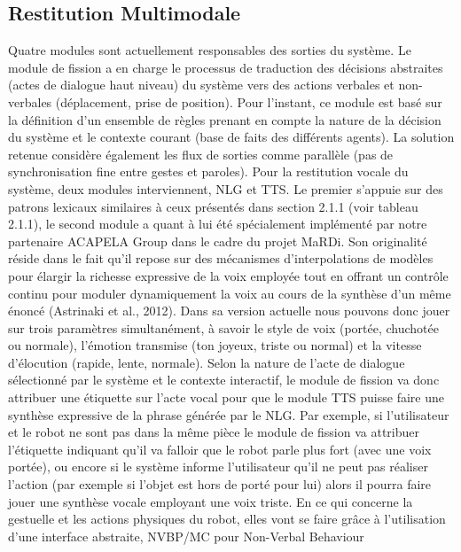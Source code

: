 \documentclass[a4paper,11pt,twoside]{StyleThese}
\begin{document}


\subsection{Restitution Multimodale}
Quatre modules sont actuellement responsables
des sorties du système.
Le module de fission a en charge
le processus de traduction des décisions abstraites (actes de dialogue haut niveau) du système vers des actions verbales et non-verbales (déplacement, prise de position).
Pour l’instant, ce module est basé sur la définition d’un ensemble de règles prenant
en compte la nature de la décision du système et le contexte courant (base de faits des
différents agents). La solution retenue considère également les flux de sorties comme
parallèle (pas de synchronisation fine entre gestes et paroles).
Pour la restitution vocale du système, deux modules interviennent, NLG et TTS. Le
premier s’appuie sur des patrons lexicaux similaires à ceux présentés dans section 2.1.1
(voir tableau 2.1.1), le second module a quant à lui été spécialement implémenté par
notre partenaire ACAPELA Group dans le cadre du projet MaRDi. Son originalité réside
dans le fait qu’il repose sur des mécanismes d’interpolations de modèles pour élargir la
richesse expressive de la voix employée tout en offrant un contrôle continu pour moduler
dynamiquement la voix au cours de la synthèse d’un même énoncé (Astrinaki et al.,
2012). Dans sa version actuelle nous pouvons donc jouer sur trois paramètres simultanément,
à savoir le style de voix (portée, chuchotée ou normale), l’émotion transmise
(ton joyeux, triste ou normal) et la vitesse d’élocution (rapide, lente, normale).
Selon la nature de l’acte de dialogue sélectionné par le système et le contexte interactif,
le module de fission va donc attribuer une étiquette sur l’acte vocal pour que le
module TTS puisse faire une synthèse expressive de la phrase générée par le NLG. Par
exemple, si l’utilisateur et le robot ne sont pas dans la même pièce le module de fission
va attribuer l’étiquette indiquant qu’il va falloir que le robot parle plus fort (avec
une voix portée), ou encore si le système informe l’utilisateur qu’il ne peut pas réaliser
l’action (par exemple si l’objet est hors de porté pour lui) alors il pourra faire jouer une
synthèse vocale employant une voix triste.
En ce qui concerne la gestuelle et les actions physiques du robot, elles vont se
faire grâce à l’utilisation d’une interface abstraite, NVBP/MC pour Non-Verbal Behaviour
\end{document}
